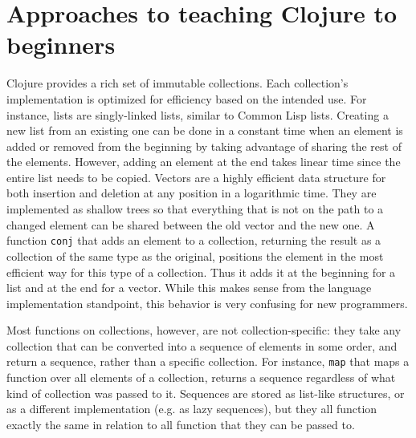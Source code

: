 \documentclass[submission,copyright,creativecommons]{eptcs}
\newcommand{\allcomments}[1]{{#1}}
\newcommand{\todo}[1]{{\bf \color{magenta}{\allcomments{ To-do: {#1}}}}}
\begin{document}

\section{Approaches to teaching Clojure to beginners}\label{sec:approaches}
Clojure provides a rich set of immutable collections. Each collection's  implementation  is optimized for efficiency based on the intended use. 
For instance, lists are singly-linked lists, similar to Common Lisp lists. Creating a new list from an existing one can be done in a constant time when an element is added or removed from the beginning by taking advantage of sharing the rest of the elements. %
However, adding an element at the end takes linear time since the entire list needs to be copied. 
Vectors are a highly efficient data structure for both insertion and deletion at any position in a logarithmic time.
They are implemented as shallow trees so that everything that is not on the path to a changed element can be shared between the old vector and the new one.
A function {\tt conj} that adds an element to a collection, returning the result as a collection of the same type as the original, positions the element in the most efficient way for this type of a collection. Thus it adds it at the beginning for a list and at the end for a vector. While this makes sense from the language implementation standpoint, this behavior is very confusing for new programmers. 

Most functions on collections, however, are not collection-specific: they take any collection that can be converted into a sequence of elements in some order, and return a sequence, rather than a specific collection. For instance, {\tt map} that maps a function
over all elements of a collection, returns a sequence regardless of what kind of collection was passed to it. Sequences are stored as list-like structures, or as a different implementation (e.g. as lazy sequences), but they all function exactly the same in relation to all function that they can be passed to. 
\end{document}
